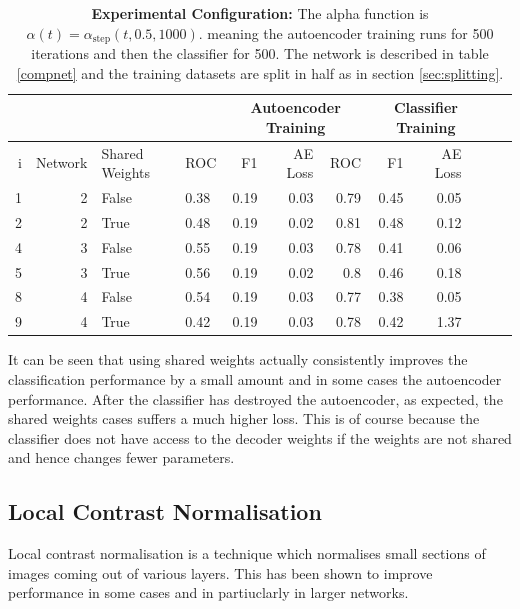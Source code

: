       \begin{table}[!h] \centering
      {\small
      \begin{tabular}{rrllrrrrrrrr}
        &&&&   \multicolumn{3}{|c|}{Autoencoder Training} &  \multicolumn{3}{c|}{Classifier Training}    \\
      \hline
        i & Network               &   Shared Weights &    ROC&F1&AE Loss & ROC & F1 & AE Loss \\
      \hline
       1 & 2    & False     &    0.38 &   0.19 &     0.03 &    0.79 &   0.45 &     0.05 \\
       2 & 2    & True      &    0.48 &   0.19 &     0.02 &    0.81 &   0.48 &     0.12 \\
      \hline
      4 & 3    & False     &    0.55 &   0.19 &     0.03 &    0.78 &   0.41 &     0.06 \\
      5 & 3    & True      &    0.56 &   0.19 &     0.02 &    0.8  &   0.46 &     0.18 \\
      \hline
      8 & 4     & False     &    0.54 &   0.19 &     0.03 &    0.77 &   0.38 &     0.05 \\
      9 & 4     & True      &    0.42 &   0.19 &     0.03 &    0.78 &   0.42 &     1.37 \\
       \hline
      \end{tabular}}\caption{{\bf Experimental Configuration:}
      The alpha function is $\alpha(t)=\alpha_{\text{step}}(t,0.5,1000)$.
      meaning the autoencoder training runs for 500 iterations and then the classifier for 500.
      The network is described in table \ref{compnet} and the training datasets are split in half as in section
      \ref{sec:splitting}.} \label{tab:sharedweights} \end{table}

      It can be seen that using shared weights actually consistently improves the classification
      performance by a small amount and in some cases the autoencoder performance. After the classifier has
      destroyed the autoencoder, as expected, the shared weights cases suffers a much higher loss. This is of course
      because the classifier does not have access to the decoder weights if the weights are not shared and hence
      changes fewer parameters.
    \subsection{Local Contrast Normalisation}
      Local contrast normalisation is a technique which normalises small sections of
      images coming out of various layers. This has been shown to improve performance
      in some cases and in partiuclarly in larger networks.



